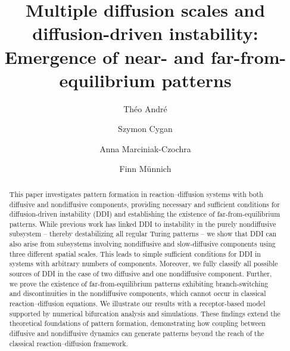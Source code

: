 \documentclass[12pt, a4paper]{amsart}
\title[Multiple diffusion scales and DDI]{Multiple diffusion scales and diffusion-driven instability: Emergence of near- and far-from-equilibrium patterns}
\author[T. André]{Théo André \href{https://orcid.org/0009-0001-7320-1941}{\orcidicon}}
\author[S. Cygan]{Szymon Cygan \href{https://orcid.org/0000-0002-8601-829X}{\orcidicon}}
\author[A. Marciniak-Czochra]{Anna Marciniak-Czochra \href{https://orcid.org/0000-0002-5831-6505}{\orcidicon}}
\author[F. Münnich]{Finn Münnich \href{https://orcid.org/0009-0007-9384-2002}{\orcidicon}}
\date{}
\numberwithin{equation}{section}
\begin{document}



\begin{abstract}
    This paper investigates pattern formation in reaction--diffusion systems with both diffusive and nondiffusive components, providing necessary and sufficient conditions for diffusion-driven instability (DDI) and establishing the existence of far-from-equilibrium patterns.
    While previous work has linked DDI to instability in the purely nondiffusive subsystem -- thereby destabilizing all regular Turing patterns -- we show that DDI can also arise from subsystems involving nondiffusive and slow-diffusive components using three different spatial scales. This leads to simple sufficient conditions for DDI in systems with arbitrary numbers of components.
    Moreover, we fully classify all possible sources of DDI in the case of two diffusive and one nondiffusive component.
    Further, we prove the existence of far-from-equilibrium patterns exhibiting branch-switching and discontinuities in the nondiffusive components, which cannot occur in classical reaction--diffusion equations. 
    We illustrate our results with a receptor-based model supported by numerical bifurcation analysis and simulations.
    These findings extend the theoretical foundations of pattern formation, demonstrating how coupling between diffusive and nondiffusive dynamics can generate patterns beyond the reach of the classical reaction--diffusion framework.
\end{abstract}

\maketitle
\end{document}
